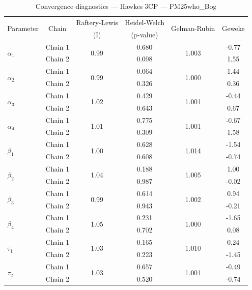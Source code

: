 \begin{table}[H]
\centering
\caption{Convergence diagnostics — Hawkes 3CP — PM25who_Bog}
\begin{tabular}{lccccc}
\toprule
\multirow{2}{*}{Parameter} & \multirow{2}{*}{Chain} & Raftery-Lewis & Heidel-Welch & \multirow{2}{*}{Gelman-Rubin} & \multirow{2}{*}{Geweke} \\
 & & (I) & (p-value) & & (z) \\
\midrule
\multirow{2}{*}{$\alpha_1$} & Chain 1 & \multirow{2}{*}{0.99} & 0.680 & \multirow{2}{*}{1.003} & -0.77 \\
 & Chain 2 & & 0.098 & & 1.55 \\
\multirow{2}{*}{$\alpha_2$} & Chain 1 & \multirow{2}{*}{0.99} & 0.064 & \multirow{2}{*}{1.000} & 1.44 \\
 & Chain 2 & & 0.326 & & 0.36 \\
\multirow{2}{*}{$\alpha_3$} & Chain 1 & \multirow{2}{*}{1.02} & 0.429 & \multirow{2}{*}{1.001} & -0.44 \\
 & Chain 2 & & 0.643 & & 0.67 \\
\multirow{2}{*}{$\alpha_4$} & Chain 1 & \multirow{2}{*}{1.01} & 0.775 & \multirow{2}{*}{1.001} & -0.67 \\
 & Chain 2 & & 0.309 & & 1.58 \\
\midrule
\multirow{2}{*}{$\beta_1$} & Chain 1 & \multirow{2}{*}{1.00} & 0.628 & \multirow{2}{*}{1.014} & -1.54 \\
 & Chain 2 & & 0.608 & & -0.74 \\
\multirow{2}{*}{$\beta_2$} & Chain 1 & \multirow{2}{*}{1.04} & 0.188 & \multirow{2}{*}{1.005} & 1.00 \\
 & Chain 2 & & 0.987 & & -0.02 \\
\multirow{2}{*}{$\beta_3$} & Chain 1 & \multirow{2}{*}{0.99} & 0.614 & \multirow{2}{*}{1.002} & 0.94 \\
 & Chain 2 & & 0.943 & & -0.21 \\
\multirow{2}{*}{$\beta_4$} & Chain 1 & \multirow{2}{*}{1.05} & 0.231 & \multirow{2}{*}{1.000} & -1.65 \\
 & Chain 2 & & 0.702 & & 0.08 \\
\midrule
\multirow{2}{*}{$\tau_1$} & Chain 1 & \multirow{2}{*}{1.03} & 0.165 & \multirow{2}{*}{1.010} & 0.24 \\
 & Chain 2 & & 0.223 & & -1.45 \\
\multirow{2}{*}{$\tau_2$} & Chain 1 & \multirow{2}{*}{1.03} & 0.657 & \multirow{2}{*}{1.001} & -0.49 \\
 & Chain 2 & & 0.520 & & -0.74 \\

\end{tabular}
\end{table}
